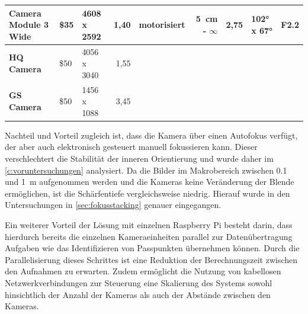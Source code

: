 \documentclass[./00PhotoBox.tex]{subfiles}
\begin{document}
\begin{table}
{\begin{tabular}{l|l|l|r|lr|r|l|r|}
            \multicolumn{1}{|l|}{\textbf{Camera Module 3 Wide}} & \$35                         & \cellcolor[HTML]{9AFF99}4608 x 2592                                  & 1,40                                                              & \multicolumn{1}{l|}{\cellcolor[HTML]{9AFF99}motorisiert}                    & \cellcolor[HTML]{9AFF99}\SI{5}{\centi\metre} - $\infty$                  & 2,75                     & 102° x 67°               & F2.2                         \\ \hline
            \multicolumn{1}{|l|}{\textbf{HQ Camera}}            & \cellcolor[HTML]{FFCCC9}\$50 & 4056 x 3040                                                          & 1,55                                                              & \multicolumn{1}{l|}{\cellcolor[HTML]{FFCCC9}{\color[HTML]{000000} manuell}} & \cellcolor[HTML]{C0C0C0}                                                 & \cellcolor[HTML]{C0C0C0} & \cellcolor[HTML]{C0C0C0} & \cellcolor[HTML]{C0C0C0}     \\ \hline
            \multicolumn{1}{|l|}{\textbf{GS Camera}}            & \cellcolor[HTML]{FFCCC9}\$50 & 1456 x 1088                                                          & \cellcolor[HTML]{9AFF99}3,45                                      & \multicolumn{1}{l|}{\cellcolor[HTML]{FFCCC9}{\color[HTML]{000000} manuell}} & \cellcolor[HTML]{C0C0C0}                                                 & \cellcolor[HTML]{C0C0C0} & \cellcolor[HTML]{C0C0C0} & \cellcolor[HTML]{C0C0C0}     \\ \hline
        \end{tabular}
    }
\end{table}

Nachteil und Vorteil zugleich ist, dass die Kamera über einen Autofokus verfügt, der aber auch elektronisch gesteuert manuell fokussieren kann. Dieser verschlechtert die Stabilität der inneren Orientierung und wurde daher im \autoref{c:voruntersuchungen} analysiert. Da die Bilder im Makrobereich zwischen \SI{0,1}{} und \SI{1}{\metre} aufgenommen werden und die Kameras keine Veränderung der Blende ermöglichen, ist die Schärfentiefe vergleichsweise niedrig. Hierauf wurde in den Untersuchungen in \autoref{sec:fokusstacking} genauer eingegangen.

Ein weiterer Vorteil der Lösung mit einzelnen Raspberry Pi besteht darin, dass hierdurch bereits die einzelnen Kameraeinheiten parallel zur Datenübertragung Aufgaben wie das Identifizieren von Passpunkten übernehmen können. Durch die Parallelisierung dieses Schrittes ist eine Reduktion der Berechnungszeit zwischen den Aufnahmen zu erwarten. Zudem ermöglicht die Nutzung von kabellosen Netzwerkverbindungen zur Steuerung eine Skalierung des Systems sowohl hinsichtlich der Anzahl der Kameras als auch der Abstände zwischen den Kameras.
\end{document}
